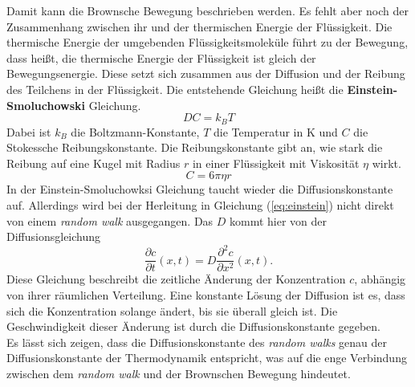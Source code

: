 Damit kann die Brownsche Bewegung beschrieben werden. Es fehlt aber noch der Zusammenhang zwischen ihr und der thermischen Energie der Flüssigkeit. Die thermische Energie der umgebenden Flüssigkeitsmoleküle führt zu der Bewegung, dass heißt, die thermische Energie der Flüssigkeit ist gleich der Bewegungsenergie. Diese setzt sich zusammen aus der Diffusion und der Reibung des Teilchens in der Flüssigkeit. Die entstehende Gleichung heißt die  \textbf{Einstein-Smoluchowski} Gleichung.
\begin{equation}
  D C = k_B T \label{eq:einstein}
\end{equation}
Dabei ist $k_B$ die Boltzmann-Konstante, $T$ die Temperatur in K und $C$ die Stokessche Reibungskonstante. Die Reibungskonstante gibt an, wie stark die Reibung auf eine Kugel mit Radius $r$ in einer Flüssigkeit mit Viskosität $\eta$ wirkt.
\begin{equation}
  C = 6 \pi \eta r
\end{equation}
In der Einstein-Smoluchowksi Gleichung taucht wieder die Diffusionskonstante auf. Allerdings wird bei der Herleitung in Gleichung (\ref{eq:einstein}) nicht direkt von einem \emph{random walk} ausgegangen. Das $D$ kommt hier von der Diffusionsgleichung
\begin{equation}
  \frac{\partial c}{\partial t}(x, t) = D \frac{\partial^2 c}{\partial x^2} (x, t). \label{eq:diffusion}
\end{equation}
Diese Gleichung beschreibt die zeitliche Änderung der Konzentration $c$, abhängig von ihrer räumlichen Verteilung. Eine konstante Lösung der Diffusion ist es, dass sich die Konzentration solange ändert, bis sie überall gleich ist. Die Geschwindigkeit dieser Änderung ist durch die Diffusionskonstante gegeben.\\
Es lässt sich zeigen, dass die Diffusionskonstante des \emph{random walks} genau der Diffusionskonstante der Thermodynamik entspricht, was auf die enge Verbindung zwischen dem \emph{random walk} und der Brownschen Bewegung hindeutet.

